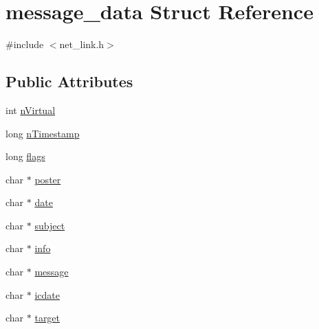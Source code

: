 \hypertarget{structmessage__data}{\section{message\-\_\-data Struct Reference}
\label{structmessage__data}
}


{\ttfamily \#include $<$net\-\_\-link.\-h$>$}

\subsection*{Public Attributes}
\begin{DoxyCompactItemize}
\item 
int \hyperlink{structmessage__data_af515291944b6a6bca2691f17011a4912}{n\-Virtual}
\item 
long \hyperlink{structmessage__data_a309b3b979bba01f3d1ed02c748181b89}{n\-Timestamp}
\item 
long \hyperlink{structmessage__data_af7cf3761d12c356ef956a6310d238796}{flags}
\item 
char $\ast$ \hyperlink{structmessage__data_a8e32e1ef2badc1155fe33c86a7a589b9}{poster}
\item 
char $\ast$ \hyperlink{structmessage__data_a6ab4c9b9a0f22a2bdabd8f9cfac312ad}{date}
\item 
char $\ast$ \hyperlink{structmessage__data_a69def671138afb7572f9a67d8c32a8d9}{subject}
\item 
char $\ast$ \hyperlink{structmessage__data_af31540c3a3a2deea7204404d96514edd}{info}
\item 
char $\ast$ \hyperlink{structmessage__data_a053ca95bb66adde61826498e8330fc9c}{message}
\item 
char $\ast$ \hyperlink{structmessage__data_af68425ba43f8e70ee0c6fecb750154de}{icdate}
\item 
char $\ast$ \hyperlink{structmessage__data_a8b1ac3a31472876aa85ec7dd759ba98e}{target}
\end{DoxyCompactItemize}



